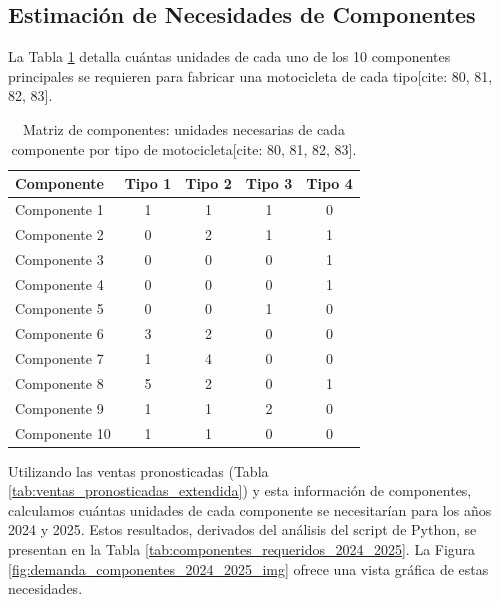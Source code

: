 \documentclass[12pt,a4paper]{article}
\begin{document}
\begin{table}[H]
\centering
\caption{Ventas pronosticadas (unidades) para 2023-2027, redondeadas[cite: 70, 71, 72, 73].}
\label{tab:ventas_pronosticadas_extendida}
\end{table}

\newpage %
\subsection{Estimación de Necesidades de Componentes}
La Tabla \ref{tab:componentes_definicion} detalla cuántas unidades de cada uno de los 10 componentes principales se requieren para fabricar una motocicleta de cada tipo[cite: 80, 81, 82, 83].
\begin{table}[H]
\centering
\caption{Matriz de componentes: unidades necesarias de cada componente por tipo de motocicleta[cite: 80, 81, 82, 83].}
\label{tab:componentes_definicion}
\begin{tabular}{@{}lcccc@{}}
\toprule
Componente   & Tipo 1 & Tipo 2 & Tipo 3 & Tipo 4 \\ \midrule
Componente 1 & 1      & 1      & 1      & 0      \\
Componente 2 & 0      & 2      & 1      & 1      \\
Componente 3 & 0      & 0      & 0      & 1      \\
Componente 4 & 0      & 0      & 0      & 1      \\
Componente 5 & 0      & 0      & 1      & 0      \\
Componente 6 & 3      & 2      & 0      & 0      \\
Componente 7 & 1      & 4      & 0      & 0      \\
Componente 8 & 5      & 2      & 0      & 1      \\
Componente 9 & 1      & 1      & 2      & 0      \\
Componente 10& 1      & 1      & 0      & 0      \\ \bottomrule
\end{tabular}
\end{table}
Utilizando las ventas pronosticadas (Tabla \ref{tab:ventas_pronosticadas_extendida}) y esta información de componentes, calculamos cuántas unidades de cada componente se necesitarían para los años 2024 y 2025. Estos resultados, derivados del análisis del script de Python, se presentan en la Tabla \ref{tab:componentes_requeridos_2024_2025}. La Figura \ref{fig:demanda_componentes_2024_2025_img} ofrece una vista gráfica de estas necesidades.
\end{document}
